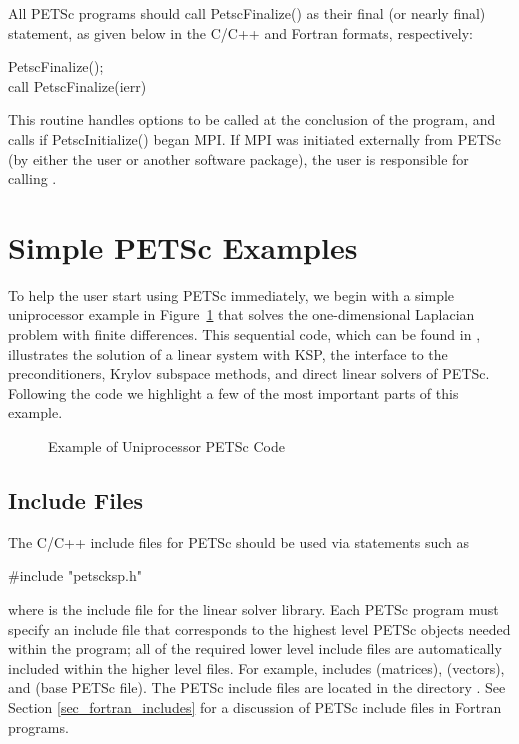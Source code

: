 All PETSc programs should call PetscFinalize()
as their final (or nearly final) statement, as given below in the C/C++
and Fortran formats, respectively:
\begin{tabbing}
  PetscFinalize();\\
  call PetscFinalize(ierr)
\end{tabbing}
This routine handles options to be called at the conclusion of
the program, and calls  
if PetscInitialize()
began MPI. If MPI was initiated externally from PETSc (by either
the user or another software package), the user is
responsible for calling .

\section{Simple PETSc Examples}

\label{sec_simple}

To help the user start using PETSc immediately, we begin with a simple
uniprocessor example in Figure~\ref{fig_example1} that solves the
one-dimensional Laplacian problem with finite differences.  This
sequential code, which can be found in
,
illustrates the solution of a linear system with KSP, the
interface to the preconditioners, Krylov subspace methods, and direct
linear solvers of PETSc.  Following the code we highlight a few of the most important
parts of this example.

\begin{figure}[H]
{\footnotesize
{}
}
\caption{Example of Uniprocessor PETSc Code}
\label{fig_example1}
\end{figure}

\subsection*{Include Files}

The C/C++ include files for PETSc should be used via statements such as
\begin{tabbing}
{\footnotesize
   \#include "petscksp.h"
}
\end{tabbing}
where  is the include file for the linear solver library.
Each PETSc program must specify an
include file that corresponds to the highest level PETSc objects
needed within the program; all of the required lower level include
files are automatically included within the higher level files.  For
example,  includes  (matrices),
 (vectors), and  (base PETSc file).
The PETSc include files are located in the directory
.  See Section \ref{sec_fortran_includes}
for a discussion of PETSc include files in Fortran programs.

